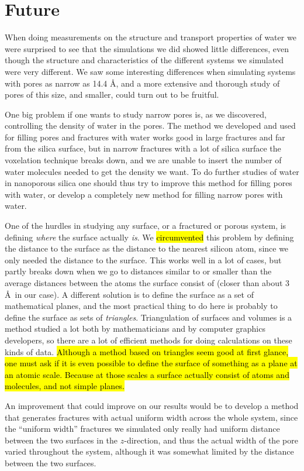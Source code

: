 \section{Future}
When doing measurements on the structure and transport properties of water we were surprised to see that the simulations we did showed little differences, even though the structure and characteristics of the different systems we simulated were very different. We saw some interesting differences when simulating systems with pores as narrow as 14.4 \AA, and a more extensive and thorough study of pores of this size, and smaller, could turn out to be fruitful. 

One big problem if one wants to study narrow pores is, as we discovered, controlling the density of water in the pores. The method we developed and used for filling pores and fractures with water works good in large fractures and far from the silica surface, but in narrow fractures with a lot of silica surface the voxelation technique breaks down, and we are unable to insert the number of water molecules needed to get the density we want. To do further studies of water in nanoporous silica one should thus try to improve this method for filling pores with water, or develop a completely new method for filling narrow pores with water.

One of the hurdles in studying any surface, or a fractured or porous system, is defining \emph{where} the surface actually \emph{is}. We \hl{circumvented} this problem by defining the distance to the surface as the distance to the nearest silicon atom, since we only needed the distance to the surface. This works well in a lot of cases, but partly breaks down when we go to distances similar to or smaller than the average distances between the atoms the surface consist of (closer than about 3 \AA\ in our case). A different solution is to define the surface as a set of mathematical planes, and the most practical thing to do here is probably to define the surface as sets of \emph{triangles}. Triangulation of surfaces and volumes is a method studied a lot both by mathematicians and by computer graphics developers, so there are a lot of efficient methods for doing calculations on these kinds of data. \hl{Although a method based on triangles seem good at first glance, one must ask if it is even possible to define the surface of something as a plane at an atomic scale. Because at those scales a surface actually consist of atoms and molecules, and not simple planes.}

An improvement that could improve on our results would be to develop a method that generates fractures with actual uniform width across the whole system, since the ``uniform width'' fractures we simulated only really had uniform distance between the two surfaces in the $z$-direction, and thus the actual width of the pore varied throughout the system, although it was somewhat limited by the distance between the two surfaces.

